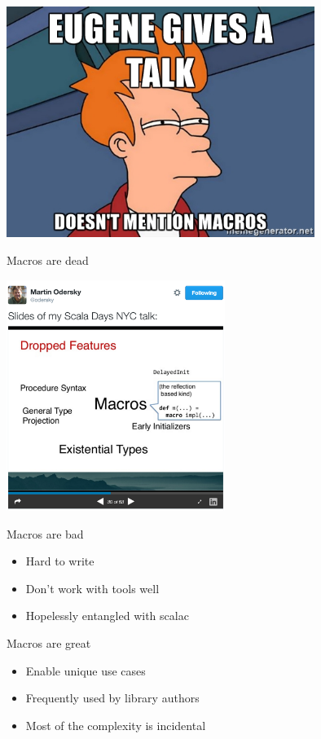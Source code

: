 \documentclass[svgnames,dvipsnames,hyperref={bookmarks=false},usepdftitle=false]{beamer}
\begin{document}
\begin{frame}{}
\vskip20pt
\begin{center}
\includegraphics[height=7.5cm]{not-sure.jpg}
\end{center}
\end{frame}

\begin{frame}{Macros are dead}
\vskip20pt
\begin{center}
\includegraphics[height=7.5cm]{macros-are-dead.png}
\end{center}
\end{frame}

\begin{frame}{Macros are bad}
\begin{itemize}
\item Hard to write
\item Don't work with tools well
\item Hopelessly entangled with scalac
\end{itemize}
\end{frame}

\begin{frame}{Macros are great}
\begin{itemize}
\item Enable unique use cases
\item Frequently used by library authors
\item Most of the complexity is incidental
\end{itemize}
\end{frame}
\end{document}
